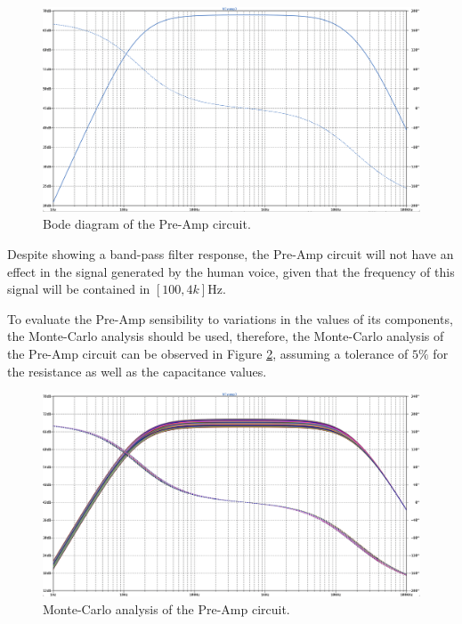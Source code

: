 \begin{figure}[H]
    \centering
    \includegraphics*[scale = 0.25]{Images/SimAmpFreq.png}
    \caption{Bode diagram of the Pre-Amp circuit.}
    \label{fig:SimAmpFreq}
\end{figure}

Despite showing a band-pass filter response, the Pre-Amp circuit will not have an effect in the signal generated by the human voice, given that the frequency of this signal will be contained in $[100, 4k]\si{\hertz}$.

To evaluate the Pre-Amp sensibility to variations in the values of its components, the Monte-Carlo analysis should be used, therefore, the Monte-Carlo analysis of the Pre-Amp circuit can be observed in Figure \ref{fig:Monte-carloPreAmp}, assuming a tolerance of $5\%$ for the resistance as well as the capacitance values.

\begin{figure}[H]
    \centering
    \includegraphics*[scale = 0.25]{Images/Monte-carloPreAmp.png}
    \caption{Monte-Carlo analysis of the Pre-Amp circuit.}
    \label{fig:Monte-carloPreAmp}
\end{figure}

